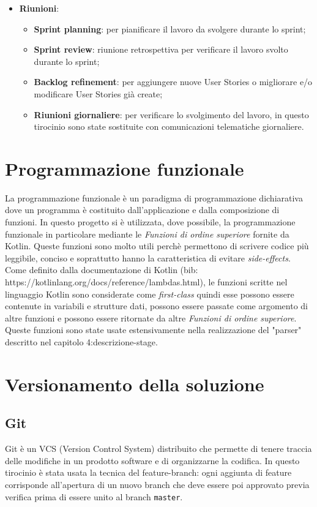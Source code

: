 \begin{itemize}
	\item \textbf{Riunioni}:
		\begin{itemize}
			\item \textbf{Sprint planning}: per pianificare il lavoro da svolgere durante lo sprint;
			\item \textbf{Sprint review}: riunione retrospettiva per verificare il lavoro svolto durante lo sprint;
			\item \textbf{Backlog refinement}: per aggiungere nuove User Stories o migliorare e/o modificare User Stories già create;
			\item \textbf{Riunioni giornaliere}: per verificare lo svolgimento del lavoro, in questo tirocinio sono state sostituite con comunicazioni telematiche giornaliere.
		\end{itemize}
\end{itemize}

\section{Programmazione funzionale}
La programmazione funzionale è un paradigma di programmazione dichiarativa dove un programma è costituito dall'applicazione e dalla composizione di funzioni. In questo progetto si è utilizzata, dove possibile, la programmazione funzionale in particolare mediante le \emph{Funzioni di ordine superiore} fornite da Kotlin. Queste funzioni sono molto utili perchè permettono di scrivere codice più leggibile, conciso e soprattutto hanno la caratteristica di evitare \emph{side-effects}. Come definito dalla documentazione di Kotlin (bib: https://kotlinlang.org/docs/reference/lambdas.html), le funzioni scritte nel linguaggio Kotlin sono considerate come \emph{first-class} quindi esse possono essere contenute in variabili e strutture dati, possono essere passate come argomento di altre funzioni e possono essere ritornate da altre \emph{Funzioni di ordine superiore}. Queste funzioni sono state usate estensivamente nella realizzazione del "parser" descritto nel capitolo 4:descrizione-stage.

\section{Versionamento della soluzione}
\subsection{Git}
Git è un VCS (Version Control System) distribuito che permette di tenere traccia delle modifiche in un prodotto software e di organizzarne la codifica. In questo tirocinio è stata usata la tecnica del feature-branch: ogni aggiunta di feature corrisponde all'apertura di un nuovo branch che deve essere poi approvato previa verifica prima di essere unito al branch \verb|master|.

